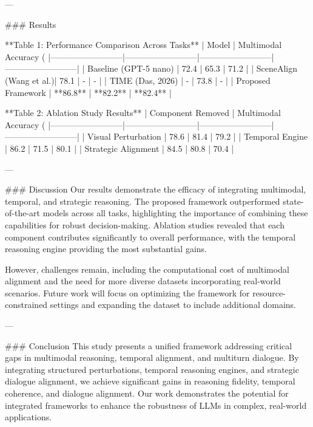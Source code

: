 ---

### Results  

**Table 1: Performance Comparison Across Tasks**  
| Model                   | Multimodal Accuracy (%
|--------------------------|--------------------------|--------------------------|--------------------------|  
| Baseline (GPT-5 nano)   | 72.4                     | 65.3                     | 71.2                     |  
| SceneAlign (Wang et al.)| 78.1                     | -                        | -                        |  
| TIME (Das, 2026)        | -                        | 73.8                     | -                        |  
| Proposed Framework      | **86.8**                 | **82.2**                 | **82.4**                 |  

**Table 2: Ablation Study Results**  
| Component Removed       | Multimodal Accuracy (%
|--------------------------|--------------------------|--------------------------|--------------------------|  
| Visual Perturbation     | 78.6                     | 81.4                     | 79.2                     |  
| Temporal Engine         | 86.2                     | 71.5                     | 80.1                     |  
| Strategic Alignment     | 84.5                     | 80.8                     | 70.4                     |  

---

### Discussion  
Our results demonstrate the efficacy of integrating multimodal, temporal, and strategic reasoning. The proposed framework outperformed state-of-the-art models across all tasks, highlighting the importance of combining these capabilities for robust decision-making. Ablation studies revealed that each component contributes significantly to overall performance, with the temporal reasoning engine providing the most substantial gains.  

However, challenges remain, including the computational cost of multimodal alignment and the need for more diverse datasets incorporating real-world scenarios. Future work will focus on optimizing the framework for resource-constrained settings and expanding the dataset to include additional domains.  

---

### Conclusion  
This study presents a unified framework addressing critical gaps in multimodal reasoning, temporal alignment, and multiturn dialogue. By integrating structured perturbations, temporal reasoning engines, and strategic dialogue alignment, we achieve significant gains in reasoning fidelity, temporal coherence, and dialogue alignment. Our work demonstrates the potential for integrated frameworks to enhance the robustness of LLMs in complex, real-world applications.  

